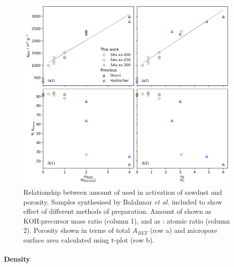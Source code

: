 \begin{figure}[t!]
    \centering
    \includegraphics[width=\columnwidth, keepaspectratio]{4-impregnation/figs/SD_porosity_compare.png}
    \caption{Relationship between amount of  used in activation of sawdust and porosity. Samples synthesised by Balahmar \textit{et al.} included to show effect of different methods of preparation.\citep{Balahmar2017Biomass} Amount of  shown as KOH:precursor mass ratio (column 1), and as : atomic ratio (column 2). Porosity shown in terms of total $A_{BET}$ (row a) and micropore surface area calculated using t-plot (row b).}
    \label{fig:SA_porosity_compare}
\end{figure}

\paragraph{Density}

